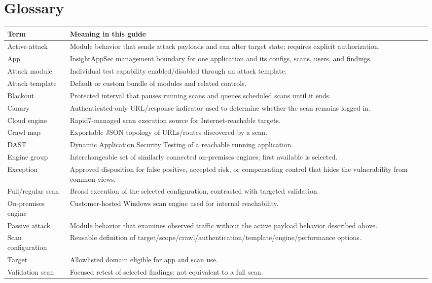 \documentclass[11pt,letterpaper,oneside]{scrreprt}
\begin{document}
\section{Glossary}
\begin{longtable}{@{}P{1.45in}P{5.15in}@{}}
\toprule
\textbf{Term} & \textbf{Meaning in this guide}\\
\midrule
\endhead
Active attack & Module behavior that sends attack payloads and can alter target state; requires explicit authorization.\\
App & InsightAppSec management boundary for one application and its configs, scans, users, and findings.\\
Attack module & Individual test capability enabled/disabled through an attack template.\\
Attack template & Default or custom bundle of modules and related controls.\\
Blackout & Protected interval that pauses running scans and queues scheduled scans until it ends.\\
Canary & Authenticated-only URL/response indicator used to determine whether the scan remains logged in.\\
Cloud engine & Rapid7-managed scan execution source for Internet-reachable targets.\\
Crawl map & Exportable JSON topology of URLs/routes discovered by a scan.\\
DAST & Dynamic Application Security Testing of a reachable running application.\\
Engine group & Interchangeable set of similarly connected on-premises engines; first available is selected.\\
Exception & Approved disposition for false positive, accepted risk, or compensating control that hides the vulnerability from common views.\\
Full/regular scan & Broad execution of the selected configuration, contrasted with targeted validation.\\
On-premises engine & Customer-hosted Windows scan engine used for internal reachability.\\
Passive attack & Module behavior that examines observed traffic without the active payload behavior described above.\\
Scan configuration & Reusable definition of target/scope/crawl/authentication/template/engine/performance options.\\
Target & Allowlisted domain eligible for app and scan use.\\
Validation scan & Focused retest of selected findings; not equivalent to a full scan.\\
\bottomrule
\end{longtable}
\end{document}
